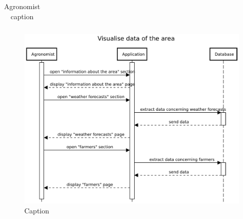 \begin{table}[H]
\begin{tabular}[c]{|l|p{}|}
    \end{tabular}
    \caption{\label{tab:Area_information_access}Agronomist caption }
\end{table}

\begin{figure}[H]
    \centering
    \includegraphics[scale=0.65]{Images/Sequence diagrams/Agronomist - visualise data of the area.pdf}
    \caption{Caption}
    \label{fig:my_label}
\end{figure}



